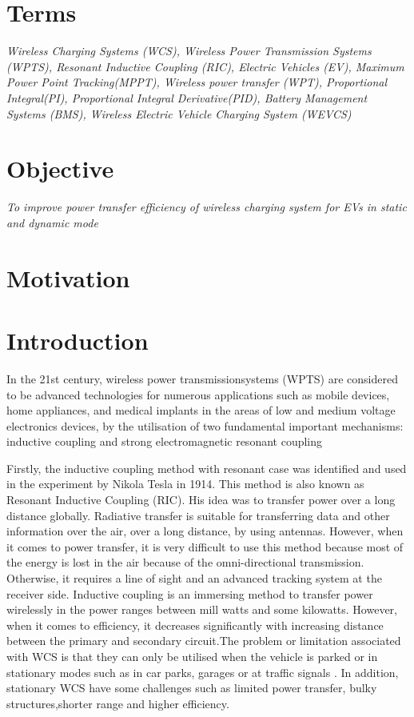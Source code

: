 \documentclass[12pt]{article}
\begin{document}

\tableofcontents
\newpage

\renewcommand{\baselinestretch}{1.5}
\section{Terms}
\textit{Wireless Charging Systems (WCS), 
	Wireless Power Transmission Systems (WPTS), 
	Resonant Inductive Coupling (RIC),
	Electric Vehicles (EV), 
	Maximum Power Point Tracking(MPPT),
	Wireless power transfer (WPT),
	Proportional Integral(PI),
	Proportional Integral Derivative(PID),
	Battery Management Systems (BMS),
Wireless Electric Vehicle Charging System (WEVCS)}

\section{Objective}
\textit{To improve power transfer efficiency of wireless charging system for EVs in static and dynamic mode}

\section{Motivation}
%

\section{Introduction}
In the 21st century, wireless power transmissionsystems (WPTS) are considered to be advanced technologies for numerous applications
such as mobile devices, home appliances, and medical implants in the areas of low and medium voltage electronics devices, by the utilisation of two fundamental important mechanisms: inductive coupling and strong electromagnetic resonant coupling %

Firstly, the inductive coupling method with resonant case was identified and used in the experiment by Nikola Tesla in 1914.  This method is also known as Resonant Inductive Coupling (RIC). His idea was to transfer power over a long distance globally. Radiative transfer is suitable for transferring data and other information over the air, over a long distance, by using antennas. However, when it comes to power transfer, it is very difficult to use this method because most of the energy is lost in the air because of the omni-directional transmission. Otherwise, it requires a line of sight and an advanced tracking system at the receiver side. Inductive coupling is an immersing method to transfer power wirelessly in the power ranges between mill watts and some kilowatts.
However, when it comes to efficiency, it decreases significantly with increasing distance between the primary and secondary circuit.The problem or limitation associated with WCS is that they can only be utilised when the vehicle is parked or in stationary modes such as in car parks, garages or at traffic signals . In addition, stationary WCS have some challenges such as limited power transfer, bulky structures,shorter range and higher efficiency. 
\end{document}

